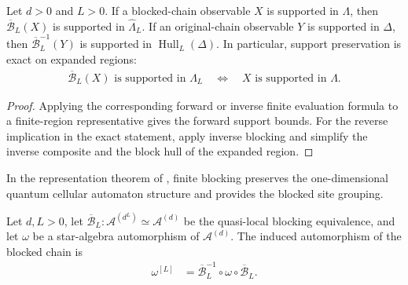 \begin{lemma}
    \label{lem:qca_quasi_local_blocking_support}
    \leanok
    Let $d>0$ and $L>0$.  If a blocked-chain observable $X$ is supported in
    $\Lambda$, then $\overline{\mathcal B}_L(X)$ is supported in
    $\widehat\Lambda_L$.  If an original-chain observable $Y$ is supported in
    $\Delta$, then $\overline{\mathcal B}_L^{-1}(Y)$ is supported in
    $\operatorname{Hull}_L(\Delta)$.  In particular, support preservation is exact
    on expanded regions:
    \begin{align}
        \overline{\mathcal B}_L(X)
        \text{ is supported in }\widehat\Lambda_L
        \quad\Longleftrightarrow\quad
        X\text{ is supported in }\Lambda.
    \end{align}
\end{lemma}

\begin{proof}\leanok
    Applying the corresponding forward or inverse finite evaluation formula to a finite-region representative
    gives the forward support bounds.  For the reverse implication in the
    exact statement, apply inverse blocking and simplify the inverse composite
    and the block hull of the expanded region.
\end{proof}

In the representation theorem of \cite[line~2308]{Cirac2017MPU}, finite blocking preserves the one-dimensional quantum cellular automaton
structure and provides the blocked site
grouping.

\begin{definition}
    \label{def:qca_blocked_automorphism}
    \leanok
    Let $d,L>0$, let
    $\overline{\mathcal B}_L\colon\mathcal A^{(d^L)}\simeq\mathcal A^{(d)}$
    be the quasi-local blocking equivalence, and let $\omega$ be a star-algebra
    automorphism of $\mathcal A^{(d)}$.  The induced automorphism of the blocked
    chain is
    \begin{align}
        \omega^{[L]}
         & =\overline{\mathcal B}_L^{-1}\circ\omega\circ
        \overline{\mathcal B}_L.
    \end{align}
\end{definition}


